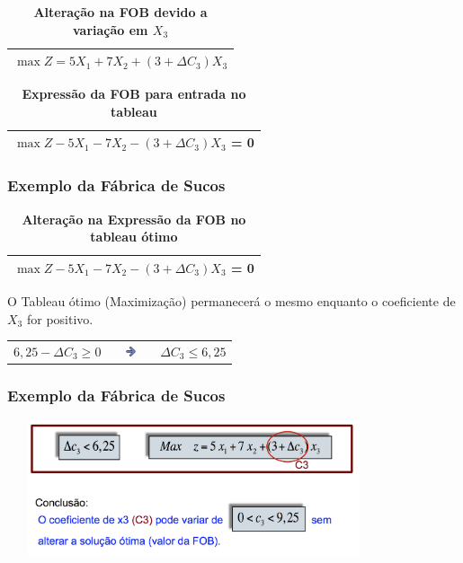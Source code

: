 \documentclass{beamer}
\begin{document}
\begin{frame}
	\begin{table}
		\scriptsize
		\caption{\textbf{Alteração na FOB devido a variação em $X_3$}}
		\begin{tabular}{| c |}
			\hline
			\cellcolor{gray!50} $ \max Z = 5X_1 + 7X_2 + (3+\Delta C_3)X_3$ \\
			\hline
		\end{tabular}
	\end{table} \pause
	
	\begin{table}
		\scriptsize
		\caption{\textbf{Expressão da FOB para entrada no tableau}}
		\begin{tabular}{| c |}
			\hline
			\cellcolor{gray!50} $ \max Z - 5X_1 - 7X_2 - (3+\Delta C_3)X_3$ = 0 \\
			\hline
		\end{tabular}
	\end{table}		
\end{frame}

\begin{frame}
	\frametitle{Exemplo da Fábrica de Sucos}
	\begin{table}
		\scriptsize
		\caption{\textbf{Alteração na Expressão da FOB no tableau ótimo}}
		\begin{tabular}{| c |}
			\hline
			\cellcolor{yellow!50} $ \max Z - 5X_1 - 7X_2 - (3+\Delta C_3)X_3$ = 0 \\
			\hline
		\end{tabular}		
	\end{table}		
	\vspace{2cm}
	O Tableau ótimo (Maximização) permanecerá o mesmo enquanto o coeficiente de $X_3$ for positivo. \pause

	\begin{table}
		\begin{tabular}{| c | c | c |}
			\cline{1-1}
			\cline{3-3}
			\cellcolor{gray!60} $6,25 - \Delta C_3 \ge 0$ & \pause
			\includegraphics[width=1cm,height=0.3cm]{seta_azul_direita.jpg} & 
			\cellcolor{gray!60} $\Delta C_3 \le 6,25$ \\
			\cline{1-1}
			\cline{3-3}
		\end{tabular}
	\end{table}

\end{frame}

\begin{frame}
	\frametitle{Exemplo da Fábrica de Sucos}
	\includegraphics[width=11cm,height=4cm]{Sensib_1.png}
\end{frame}
\end{document}
